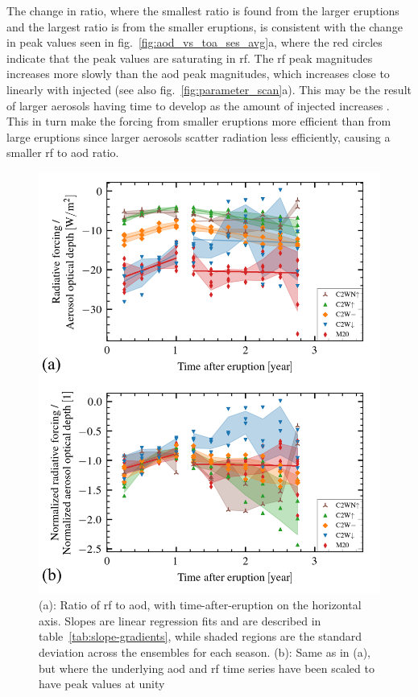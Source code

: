 \documentclass{ametsocV6.1}
\begin{document}
The change in ratio, where the smallest ratio is found from the larger eruptions and the
largest ratio is from the smaller eruptions, is consistent with the change in peak
values seen in fig.~\ref{fig:aod_vs_toa_ses_avg}a, where the red circles indicate that
the peak values are saturating in \gls{rf}. The \gls{rf} peak magnitudes increases more
slowly than the \gls{aod} peak magnitudes, which increases close to linearly with
injected  (see also fig.~\ref{fig:parameter_scan}a). This may be the result of
larger aerosols having time to develop as the amount of injected  increases
\citep{niemeier2015,marshall2019}. This in turn make the forcing from smaller eruptions
more efficient than from large eruptions since larger aerosols scatter radiation less
efficiently, causing a smaller \gls{rf} to \gls{aod} ratio.

\begin{figure}
  \centering
  \includegraphics{figures/figure3.png}

  \caption{(a): Ratio of \gls{rf} to \gls{aod}, with time-after-eruption on the horizontal
    axis. Slopes are linear regression fits and are described in
    table~\ref{tab:slope-gradients}, while shaded regions are the standard deviation across
    the ensembles for each season. (b): Same as in (a), but where the underlying \gls{aod}
    and \gls{rf} time series have been scaled to have peak values at
    unity}\label{fig:aod_vs_toa_avg_loop_ratios}%
\end{figure}
\end{document}
